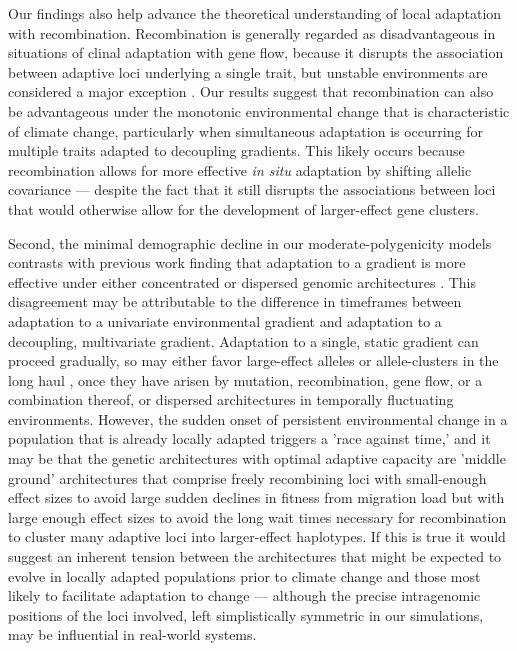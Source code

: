 \documentclass[9pt,twocolumn,twoside,lineno]{pnas-new}
\begin{document}
Our findings also help advance the theoretical understanding
of local adaptation with recombination.
Recombination is generally regarded as disadvantageous
in situations of clinal adaptation
with gene flow, because it disrupts the association between adaptive loci 
underlying a single trait,
but unstable environments are considered a major exception \cite{tigano}.
Our results suggest that recombination can also
be advantageous under the monotonic environmental
change that is characteristic of climate change,
particularly when simultaneous adaptation is occurring
for multiple traits adapted to decoupling gradients.
This likely occurs because recombination
allows for more effective \textit{in situ} adaptation
by shifting allelic covariance --- despite the fact that
it still disrupts the associations between loci
that would otherwise allow for the development of
larger-effect gene clusters.
 
Second, the minimal demographic decline
in our moderate-polygenicity models
contrasts with previous work finding that adaptation
to a gradient is more effective under either
concentrated or dispersed genomic architectures \cite{yeaman_whitlock}.
This disagreement may be attributable to the
difference in timeframes between adaptation to a univariate environmental gradient
and adaptation to a decoupling, multivariate gradient.
Adaptation to a single, static gradient can proceed gradually,
so may either favor large-effect alleles or allele-clusters in the long haul
\cite{yeaman_amnat,yeaman_review},
once they have arisen by mutation, recombination, gene flow, or a combination thereof,
or dispersed architectures 
\cite{burger,kondrashov,yeaman_review,yeaman_whitlock}
in temporally fluctuating environments.
However, the sudden onset of persistent environmental change 
in a population that is already locally adapted triggers a 'race against time,' 
and it may be that the genetic architectures with
optimal adaptive capacity are 'middle ground' architectures that comprise
freely recombining loci with small-enough effect sizes to avoid large
sudden declines in fitness from migration load
but with large enough effect sizes to avoid the long wait times necessary
for recombination to cluster many adaptive loci into larger-effect haplotypes.
If this is true it would suggest an inherent tension between the architectures that
might be expected to evolve in locally adapted populations prior to climate change
and those most likely to facilitate adaptation to change --- although
the precise intragenomic positions of the loci involved,
left simplistically symmetric in our simulations, may be influential in real-world systems.
 
\end{document}
